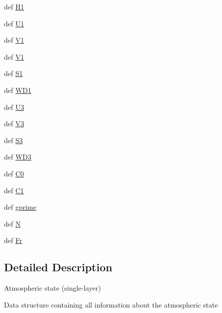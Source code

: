 \begin{DoxyCompactItemize}
def \hyperlink{classDropbox_1_1ThreeLayerModel_1_1SLM_1_1ABL_afa94639e34150a08bfdc7c9d4c5e1b5a}{H1}
\item 
def \hyperlink{classDropbox_1_1ThreeLayerModel_1_1SLM_1_1ABL_aca9036aafe7bb19d47b74a0a9e362848}{U1}
\item 
def \hyperlink{classDropbox_1_1ThreeLayerModel_1_1SLM_1_1ABL_ac20e73e5fb7d9ef25078693f9695af43}{V1}
\item 
def \hyperlink{classDropbox_1_1ThreeLayerModel_1_1SLM_1_1ABL_ac20e73e5fb7d9ef25078693f9695af43}{V1}
\item 
def \hyperlink{classDropbox_1_1ThreeLayerModel_1_1SLM_1_1ABL_a8dc42ce0b9cd1ba509bb58b85c85969a}{S1}
\item 
def \hyperlink{classDropbox_1_1ThreeLayerModel_1_1SLM_1_1ABL_afcdb874f08c27476dba2d8e32526b8a9}{W\+D1}
\item 
def \hyperlink{classDropbox_1_1ThreeLayerModel_1_1SLM_1_1ABL_a222b54b003c5675ea77b780e0c901289}{U3}
\item 
def \hyperlink{classDropbox_1_1ThreeLayerModel_1_1SLM_1_1ABL_aba237873f178656c11650a7048f22aea}{V3}
\item 
def \hyperlink{classDropbox_1_1ThreeLayerModel_1_1SLM_1_1ABL_a2cda4483fdbed9b56df3e2d4fd6f5bee}{S3}
\item 
def \hyperlink{classDropbox_1_1ThreeLayerModel_1_1SLM_1_1ABL_add609e0527fec1d212e2dc9e076d32d3}{W\+D3}
\item 
def \hyperlink{classDropbox_1_1ThreeLayerModel_1_1SLM_1_1ABL_a0f523754f94c72dccca7fe83dd9b039d}{C0}
\item 
def \hyperlink{classDropbox_1_1ThreeLayerModel_1_1SLM_1_1ABL_ab3f136e35e5ee8f13c70aade63112d63}{C1}
\item 
def \hyperlink{classDropbox_1_1ThreeLayerModel_1_1SLM_1_1ABL_a149d0c3674aa0f73a45a849bf73fd743}{gprime}
\item 
def \hyperlink{classDropbox_1_1ThreeLayerModel_1_1SLM_1_1ABL_a570546bdf1c1162af3c7903b28a3ac73}{N}
\item 
def \hyperlink{classDropbox_1_1ThreeLayerModel_1_1SLM_1_1ABL_a0213e2025ca8a0cd5b2f795c8fd9f057}{Fr}
\end{DoxyCompactItemize}


\subsection{Detailed Description}
\begin{DoxyVerb}Atmospheric state (single-layer)

Data structure containing all information about the atmospheric state
\end{DoxyVerb}
 

